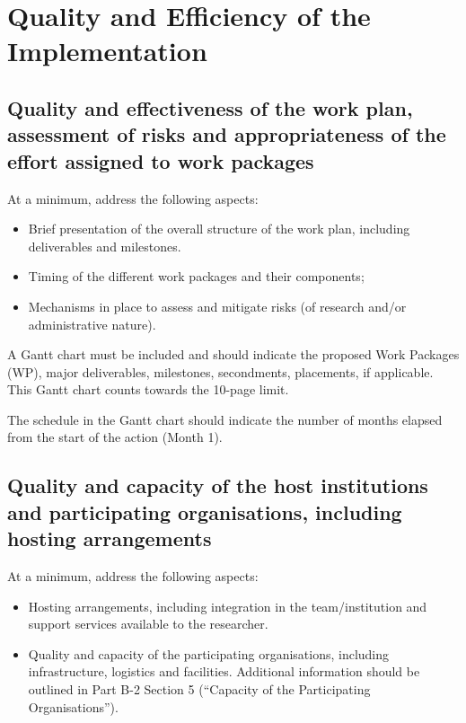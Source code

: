 \documentclass[11pt,draftproposal]{msca-pf}
\begin{document}
 

\section{Quality and Efficiency of the Implementation
            }
\label{WRK-PLA-WP}

\subsection{Quality and effectiveness of the work plan, assessment of risks and
appropriateness of the effort assigned to work packages}

At a minimum, address the following aspects:

\begin{itemize}
    \item Brief presentation of the overall structure of the work plan,
    including deliverables and milestones.

    \item Timing of the different work packages and their components;

    \item Mechanisms in place to assess and mitigate risks (of research and/or
    administrative nature).
\end{itemize}

A Gantt chart must be included and should indicate the proposed Work Packages
(WP), major deliverables, milestones, secondments, placements, if applicable.
This Gantt chart counts towards the 10-page limit.

The schedule in the Gantt chart should indicate the number of months elapsed
from the start of the action (Month 1).

\subsection{Quality and capacity of the host institutions and participating
organisations, including hosting arrangements}

At a minimum, address the following aspects:

\begin{itemize}
    \item Hosting arrangements, including integration in the team/institution
    and support services available to the researcher.

    \item Quality and capacity of the participating organisations, including
    infrastructure, logistics and facilities. Additional information should be
    outlined in Part B-2 Section 5 (``Capacity of the Participating Organisations'').
\end{itemize}
\end{document}
